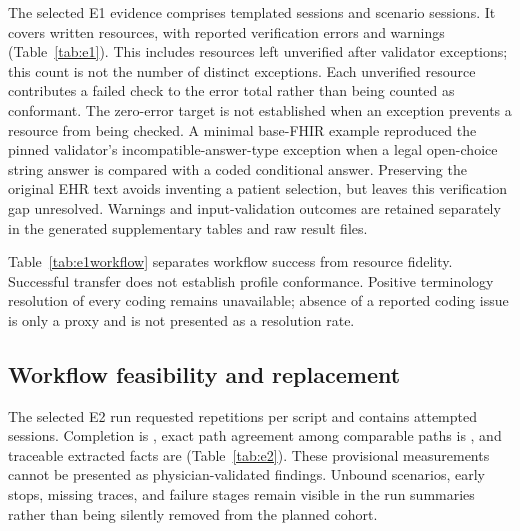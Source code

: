 The selected E1 evidence comprises \EOneTemplatedSessions{} templated sessions
and \EOneScenarioSessions{} scenario sessions. It covers \EOneResources{} written resources, with
\EOneErrors{} reported verification errors and \EOneWarnings{} warnings
(Table~\ref{tab:e1}). This includes \EOneValidatorCrashes{} resources left
unverified after validator exceptions; this count is not the number of distinct
exceptions. Each unverified resource contributes a failed check to the error
total rather than being counted as conformant.
The zero-error target is not established when an exception prevents a resource
from being checked. A minimal base-FHIR example reproduced the pinned validator's
incompatible-answer-type exception when a legal open-choice string answer is
compared with a coded conditional answer. Preserving the original EHR text avoids
inventing a patient selection, but leaves this verification gap unresolved.
Warnings and input-validation outcomes are retained separately in the generated
supplementary tables and raw result files.

\begin{table}[t]\centering
\caption{E1 written-resource validation. Exceptions count as failed verification;
input validation is excluded from these counts.}
\label{tab:e1}
\footnotesize\setlength{\tabcolsep}{3pt}

\end{table}

\begin{table}[t]\centering
\caption{E1 workflow and semantic round-trip checks. Read rates use all sessions;
write rates use sessions reaching a write attempt. Read-back uses returned
resource references, while round-trip uses all captured submissions, including
submissions with missing references or read-back.}
\label{tab:e1workflow}
\scriptsize\setlength{\tabcolsep}{3pt}

\end{table}

Table~\ref{tab:e1workflow} separates workflow success from resource fidelity.
Successful transfer does not establish profile conformance. Positive terminology
resolution of every coding remains unavailable; absence of a reported coding
issue is only a proxy and is not presented as a resolution rate.

\subsection{Workflow feasibility and replacement}
The selected E2 run requested \ETwoRepeats{} repetitions per script and contains
\ETwoSessions{} attempted sessions. Completion is
\ETwoCompletion{}, exact path agreement among comparable paths is
\ETwoProtocol{}, and traceable extracted facts are \ETwoTraceability{}
(Table~\ref{tab:e2}). These provisional measurements cannot be presented as
physician-validated findings. Unbound scenarios, early stops, missing traces, and
failure stages remain visible in the run summaries rather than being silently
removed from the planned cohort.

